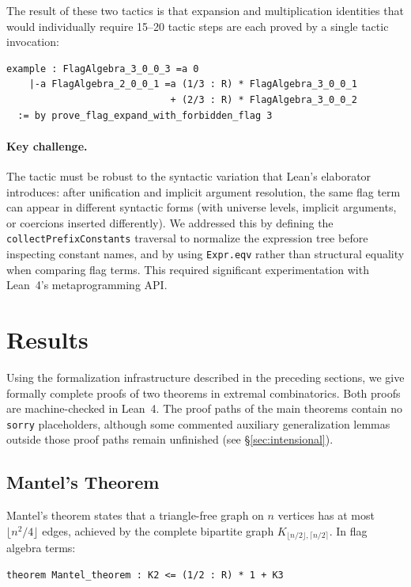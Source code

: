 \documentclass{article}
\newcommand{\lean}[1]{\texttt{#1}}
\begin{document}
The result of these two tactics is that expansion and multiplication identities
that would individually require 15--20 tactic steps are each proved by a single
tactic invocation:
\begin{lstlisting}
example : FlagAlgebra_3_0_0_3 =a 0
    |-a FlagAlgebra_2_0_0_1 =a (1/3 : R) * FlagAlgebra_3_0_0_1
                             + (2/3 : R) * FlagAlgebra_3_0_0_2
  := by prove_flag_expand_with_forbidden_flag 3
\end{lstlisting}

\paragraph{Key challenge.}
The tactic must be robust to the syntactic variation that Lean's elaborator
introduces: after unification and implicit argument resolution, the same flag
term can appear in different syntactic forms (with universe levels, implicit
arguments, or coercions inserted differently).  We addressed this by defining
the \lean{collectPrefixConstants} traversal to normalize the expression tree
before inspecting constant names, and by using \lean{Expr.eqv} rather than
structural equality when comparing flag terms.  This required significant
experimentation with Lean~4's metaprogramming API.


\section{Results}
\label{sec:results}

Using the formalization infrastructure described in the preceding sections,
we give formally complete proofs of two theorems in extremal combinatorics.
Both proofs are machine-checked in Lean~4.  The proof paths of the main
theorems contain no \lean{sorry} placeholders, although some commented
auxiliary generalization lemmas outside those proof paths remain unfinished
(see \S\ref{sec:intensional}).

\subsection{Mantel's Theorem}

Mantel's theorem states that a triangle-free graph on $n$ vertices has at
most $\lfloor n^2/4 \rfloor$ edges, achieved by the complete bipartite graph
$K_{\lfloor n/2\rfloor, \lceil n/2\rceil}$.  In flag algebra terms:

\begin{lstlisting}
theorem Mantel_theorem : K2 <= (1/2 : R) * 1 + K3
\end{lstlisting}
\end{document}

